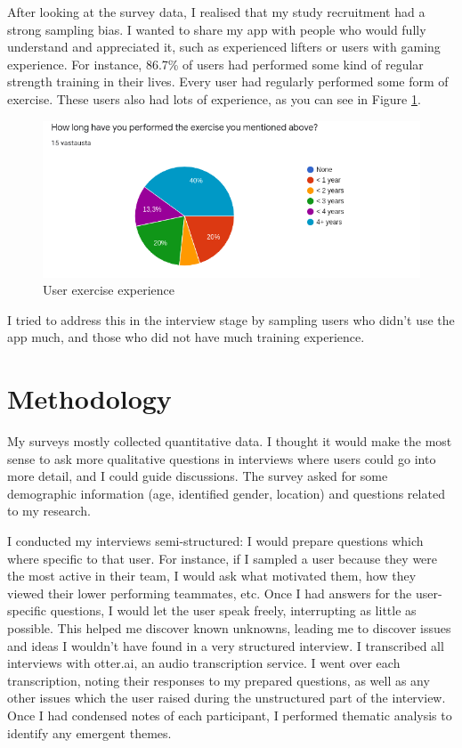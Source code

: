 \documentclass{l4proj}
\begin{document}
After looking at the survey data, I realised that my study recruitment had a strong sampling bias. I wanted to share my app with people who would fully understand and appreciated it, such as experienced lifters or users with gaming experience. For instance, 86.7\% of users had performed some kind of regular strength training in their lives. Every user had regularly performed some form of exercise. These users also had lots of experience, as you can see in Figure \ref{fig:long_performed}.
\begin{figure}[H]
    \centering
    \includegraphics[width=1.0\linewidth]{long_performed.png}    
    \caption{User exercise experience}
    \label{fig:long_performed} 
\end{figure}

I tried to address this in the interview stage by sampling users who didn't use the app much, and those who did not have much training experience. 


\section{Methodology}
My surveys mostly collected quantitative data. I thought it would make the most sense to ask more qualitative questions in interviews where users could go into more detail, and I could guide discussions. The survey asked for some demographic information (age, identified gender, location) and questions related to my research. 

I conducted my interviews semi-structured: I would prepare questions which where specific to that user. For instance, if I sampled a user because they were the most active in their team, I would ask what motivated them, how they viewed their lower performing teammates, etc. Once I had answers for the user-specific questions, I would let the user speak freely, interrupting as little as possible. This helped me discover known unknowns, leading me to discover issues and ideas I wouldn't have found in a very structured interview. I transcribed all interviews with otter.ai, an audio transcription service. I went over each transcription, noting their responses to my prepared questions, as well as any other issues which the user raised during the unstructured part of the interview. Once I had condensed notes of each participant, I performed thematic analysis to identify any emergent themes.
\end{document}
